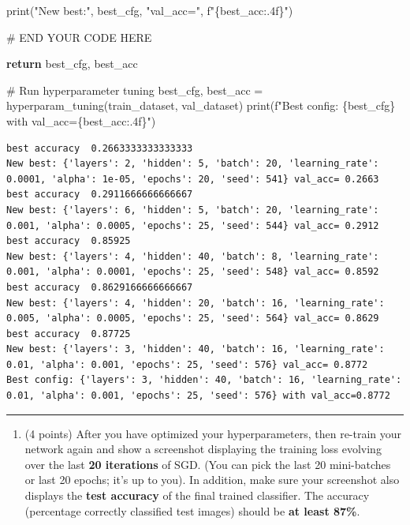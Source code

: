 \documentclass[
  letterpaper,
  DIV=11,
  numbers=noendperiod]{scrartcl}
\newenvironment{Shaded}{\begin{snugshade}}{\end{snugshade}}
\newcommand{\BuiltInTok}[1]{\textcolor[rgb]{0.00,0.23,0.31}{#1}}
\newcommand{\CommentTok}[1]{\textcolor[rgb]{0.37,0.37,0.37}{#1}}
\newcommand{\ControlFlowTok}[1]{\textcolor[rgb]{0.00,0.23,0.31}{\textbf{#1}}}
\newcommand{\NormalTok}[1]{\textcolor[rgb]{0.00,0.23,0.31}{#1}}
\newcommand{\OperatorTok}[1]{\textcolor[rgb]{0.37,0.37,0.37}{#1}}
\newcommand{\RegionMarkerTok}[1]{\textcolor[rgb]{0.00,0.23,0.31}{#1}}
\newcommand{\SpecialCharTok}[1]{\textcolor[rgb]{0.37,0.37,0.37}{#1}}
\newcommand{\SpecialStringTok}[1]{\textcolor[rgb]{0.13,0.47,0.30}{#1}}
\newcommand{\StringTok}[1]{\textcolor[rgb]{0.13,0.47,0.30}{#1}}
\providecommand{\tightlist}{%
  \setlength{\itemsep}{0pt}\setlength{\parskip}{0pt}}\usepackage{longtable,booktabs,array}
\begin{document}
\begin{Shaded}
\begin{Highlighting}[]
            \BuiltInTok{print}\NormalTok{(}\StringTok{"New best:"}\NormalTok{, best\_cfg, }\StringTok{"val\_acc="}\NormalTok{, }\SpecialStringTok{f"}\SpecialCharTok{\{}\NormalTok{best\_acc}\SpecialCharTok{:.4f\}}\SpecialStringTok{"}\NormalTok{)}



    \CommentTok{\# }\RegionMarkerTok{END}\CommentTok{ YOUR CODE HERE}

    \ControlFlowTok{return}\NormalTok{ best\_cfg, best\_acc}


\CommentTok{\# Run hyperparameter tuning}
\NormalTok{best\_cfg, best\_acc }\OperatorTok{=}\NormalTok{ hyperparam\_tuning(train\_dataset, val\_dataset)}
\BuiltInTok{print}\NormalTok{(}\SpecialStringTok{f"Best config: }\SpecialCharTok{\{}\NormalTok{best\_cfg}\SpecialCharTok{\}}\SpecialStringTok{ with val\_acc=}\SpecialCharTok{\{}\NormalTok{best\_acc}\SpecialCharTok{:.4f\}}\SpecialStringTok{"}\NormalTok{)}
\end{Highlighting}
\end{Shaded}

\label{prob2_2}
\begin{verbatim}
best accuracy  0.2663333333333333
New best: {'layers': 2, 'hidden': 5, 'batch': 20, 'learning_rate': 0.0001, 'alpha': 1e-05, 'epochs': 20, 'seed': 541} val_acc= 0.2663
best accuracy  0.2911666666666667
New best: {'layers': 6, 'hidden': 5, 'batch': 20, 'learning_rate': 0.001, 'alpha': 0.0005, 'epochs': 25, 'seed': 544} val_acc= 0.2912
best accuracy  0.85925
New best: {'layers': 4, 'hidden': 40, 'batch': 8, 'learning_rate': 0.001, 'alpha': 0.0001, 'epochs': 25, 'seed': 548} val_acc= 0.8592
best accuracy  0.8629166666666667
New best: {'layers': 4, 'hidden': 20, 'batch': 16, 'learning_rate': 0.005, 'alpha': 0.0005, 'epochs': 25, 'seed': 564} val_acc= 0.8629
best accuracy  0.87725
New best: {'layers': 3, 'hidden': 40, 'batch': 16, 'learning_rate': 0.01, 'alpha': 0.001, 'epochs': 25, 'seed': 576} val_acc= 0.8772
Best config: {'layers': 3, 'hidden': 40, 'batch': 16, 'learning_rate': 0.01, 'alpha': 0.001, 'epochs': 25, 'seed': 576} with val_acc=0.8772
\end{verbatim}

\begin{center}\rule{0.5\linewidth}{0.5pt}\end{center}

\begin{enumerate}
\def\labelenumi{\arabic{enumi}.}
\setcounter{enumi}{2}
\tightlist
\item
  (4 points) After you have optimized your hyperparameters, then
  re-train your network again and show a screenshot displaying the
  training loss evolving over the last \textbf{20 iterations} of SGD.
  (You can pick the last 20 mini-batches or last 20 epochs; it's up to
  you). In addition, make sure your screenshot also displays the
  \textbf{test accuracy} of the final trained classifier. The accuracy
  (percentage correctly classified test images) should be \textbf{at
  least 87\%}.
\end{enumerate}
\end{document}
